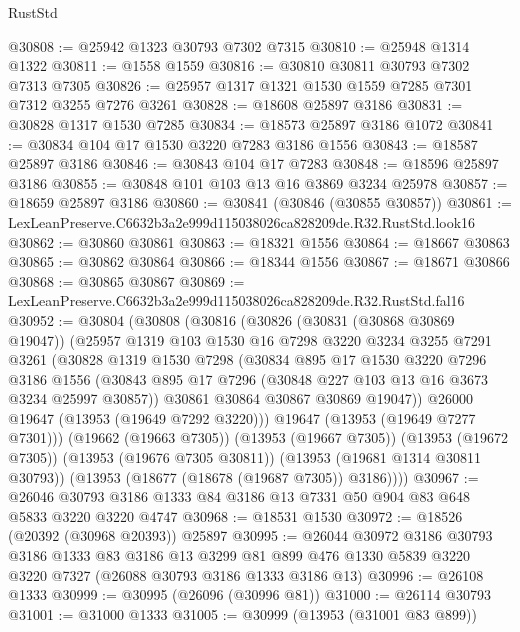 \begin{lexlean}{RustStd}
\begin{coremodule}
@30808 := @25942 @1323 @30793 @7302 @7315
@30810 := @25948 @1314 @1322
@30811 := @1558 @1559
@30816 := @30810 @30811 @30793 @7302 @7313 @7305
@30826 := @25957 @1317 @1321 @1530 @1559 @7285 @7301 @7312 @3255 @7276 @3261
@30828 := @18608 @25897 @3186
@30831 := @30828 @1317 @1530 @7285
@30834 := @18573 @25897 @3186 @1072
@30841 := @30834 @104 @17 @1530 @3220 @7283 @3186 @1556
@30843 := @18587 @25897 @3186
@30846 := @30843 @104 @17 @7283
@30848 := @18596 @25897 @3186
@30855 := @30848 @101 @103 @13 @16 @3869 @3234 @25978
@30857 := @18659 @25897 @3186
@30860 := @30841 (@30846 (@30855 @30857))
@30861 := LexLeanPreserve.C6632b3a2e999d115038026ca828209de.R32.RustStd.look16
@30862 := @30860 @30861
@30863 := @18321 @1556
@30864 := @18667 @30863
@30865 := @30862 @30864
@30866 := @18344 @1556
@30867 := @18671 @30866
@30868 := @30865 @30867
@30869 := LexLeanPreserve.C6632b3a2e999d115038026ca828209de.R32.RustStd.fal16
@30952 := @30804
    (@30808
      (@30816
        (@30826
          (@30831 (@30868 @30869 @19047))
          (@25957
            @1319
            @103
            @1530
            @16
            @7298
            @3220
            @3234
            @3255
            @7291
            @3261
            (@30828
              @1319
              @1530
              @7298
              (@30834
                @895
                @17
                @1530
                @3220
                @7296
                @3186
                @1556
                (@30843 @895 @17 @7296 (@30848 @227 @103 @13 @16 @3673 @3234 @25997 @30857))
                @30861
                @30864
                @30867
                @30869
                @19047))
            @26000
            @19647
            (@13953 (@19649 @7292 @3220)))
          @19647
          (@13953 (@19649 @7277 @7301)))
        (@19662 (@19663 @7305))
        (@13953 (@19667 @7305))
        (@13953 (@19672 @7305))
        (@13953 (@19676 @7305 @30811))
        (@13953 (@19681 @1314 @30811 @30793))
        (@13953 (@18677 (@18678 (@19687 @7305)) @3186))))
@30967 := @26046 @30793 @3186 @1333 @84 @3186 @13 @7331 @50 @904 @83 @648 @5833 @3220 @3220 @4747
@30968 := @18531 @1530
@30972 := @18526 (@20392 (@30968 @20393)) @25897
@30995 := @26044
    @30972
    @3186
    @30793
    @3186
    @1333
    @83
    @3186
    @13
    @3299
    @81
    @899
    @476
    @1330
    @5839
    @3220
    @3220
    @7327
    (@26088 @30793 @3186 @1333 @3186 @13)
@30996 := @26108 @1333
@30999 := @30995 (@26096 (@30996 @81))
@31000 := @26114 @30793
@31001 := @31000 @1333
@31005 := @30999 (@13953 (@31001 @83 @899))

\end{coremodule}
\end{lexlean}
